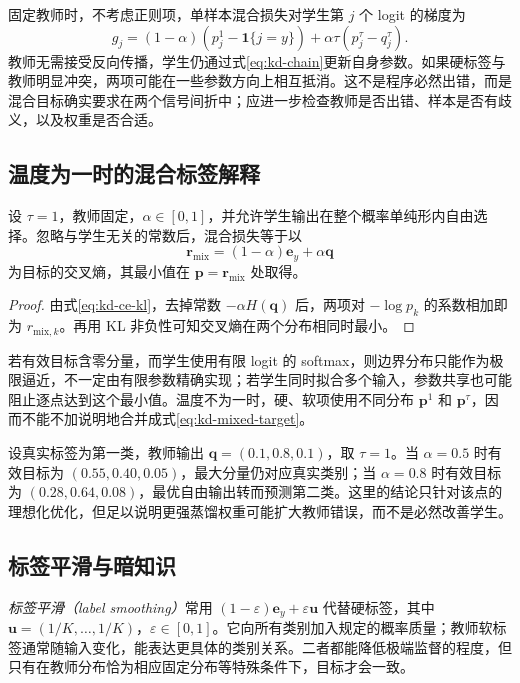 \documentclass[UTF8,12pt,a4paper,fontset=fandol]{ctexart}
\begin{document}
固定教师时，不考虑正则项，单样本混合损失对学生第 $j$ 个 logit 的梯度为
\begin{equation}
 g_j=(1-\alpha)(p_j^1-\mathbf1\{j=y\})
       +\alpha\tau(p_j^\tau-q_j^\tau).
 \label{eq:kd-total-gradient}
\end{equation}
教师无需接受反向传播，学生仍通过式\eqref{eq:kd-chain}更新自身参数。如果硬标签与教师明显冲突，两项可能在一些参数方向上相互抵消。这不是程序必然出错，而是混合目标确实要求在两个信号间折中；应进一步检查教师是否出错、样本是否有歧义，以及权重是否合适。

\subsection{温度为一时的混合标签解释}
\begin{proposition}[固定样本的有效目标]
设 $\tau=1$，教师固定，$\alpha\in[0,1]$，并允许学生输出在整个概率单纯形内自由选择。忽略与学生无关的常数后，混合损失等于以
\begin{equation}
 \mathbf r_{\mathrm{mix}}=(1-\alpha)\mathbf e_y+\alpha\mathbf q
 \label{eq:kd-mixed-target}
\end{equation}
为目标的交叉熵，其最小值在 $\mathbf p=\mathbf r_{\mathrm{mix}}$ 处取得。
\end{proposition}
\begin{proof}
由式\eqref{eq:kd-ce-kl}，去掉常数 $-\alpha H(\mathbf q)$ 后，两项对 $-\log p_k$ 的系数相加即为 $r_{\mathrm{mix},k}$。再用 KL 非负性可知交叉熵在两个分布相同时最小。
\end{proof}

若有效目标含零分量，而学生使用有限 logit 的 softmax，则边界分布只能作为极限逼近，不一定由有限参数精确实现；若学生同时拟合多个输入，参数共享也可能阻止逐点达到这个最小值。温度不为一时，硬、软项使用不同分布 $\mathbf p^1$ 和 $\mathbf p^\tau$，因而不能不加说明地合并成式\eqref{eq:kd-mixed-target}。

\begin{example}[教师犯错时标签权重的作用]
设真实标签为第一类，教师输出 $\mathbf q=(0.1,0.8,0.1)$，取 $\tau=1$。当 $\alpha=0.5$ 时有效目标为 $(0.55,0.40,0.05)$，最大分量仍对应真实类别；当 $\alpha=0.8$ 时有效目标为 $(0.28,0.64,0.08)$，最优自由输出转而预测第二类。这里的结论只针对该点的理想化优化，但足以说明更强蒸馏权重可能扩大教师错误，而不是必然改善学生。
\end{example}

\subsection{标签平滑与暗知识}
\emph{标签平滑（label smoothing）}常用 $(1-\varepsilon)\mathbf e_y+\varepsilon\mathbf u$ 代替硬标签，其中 $\mathbf u=(1/K,\ldots,1/K)$，$\varepsilon\in[0,1]$。它向所有类别加入规定的概率质量；教师软标签通常随输入变化，能表达更具体的类别关系。二者都能降低极端监督的程度，但只有在教师分布恰为相应固定分布等特殊条件下，目标才会一致。
\end{document}
